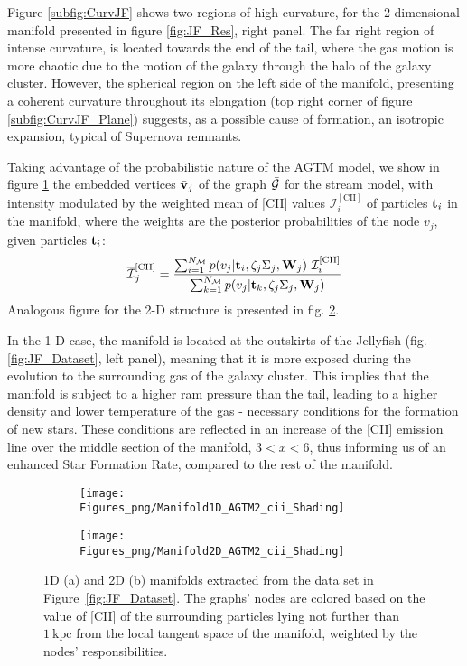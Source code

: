Figure \ref{subfig:CurvJF} shows two regions of high curvature, for the 2-dimensional manifold presented in figure \ref{fig:JF_Res}, right panel.
The far right region of intense curvature, is located towards the end of the tail, where the gas motion is more chaotic due to the motion of the galaxy through the halo of the galaxy cluster. However, the spherical region on the left side of the manifold, presenting a coherent curvature throughout its elongation (top right corner of figure \ref{subfig:CurvJF_Plane}) suggests, as a possible cause of formation, an isotropic expansion, typical of Supernova remnants. 

Taking advantage of the probabilistic nature of the AGTM model, we show in figure \ref{subfig:1dManGraph} the embedded vertices
$\bar{\boldsymbol{\mathbf{v}}}_j$ of the graph $\bar{\cal G}$
for the stream model, with intensity modulated by the weighted mean of [CII] values $\mathcal{I}^{\mathrm{[CII]}}_i$ of particles $\boldsymbol{\mathbf{t}}_i$ in the manifold, where the weights are the posterior probabilities of the node $v_j$, given  particles $\boldsymbol{\mathbf{t}}_i$:
\begin{equation}\label{eq:WeightedVar}
    \overline{\mathcal{I}}^{\mathrm{[CII]}}_j = \frac{\sum_{i=1}^{N_{\mathcal{M}}} p(v_j | \boldsymbol{\mathbf{t}}_i,\zeta_j\Sigma_j,\boldsymbol{\mathbf{W}}_j) ~ \mathcal{I}^{\mathrm{[CII]}}_i}{\sum_{k=1}^{N_{\mathcal{M}}} p(v_j | \boldsymbol{\mathbf{t}}_k,\zeta_j\Sigma_j,\boldsymbol{\mathbf{W}}_j)}
\end{equation}
Analogous figure for the 2-D structure is presented in fig. \ref{subfig:2dManGraph}.

In the 1-D case, the manifold is located at the outskirts of the Jellyfish (fig. \ref{fig:JF_Dataset}, left panel), meaning that it is more exposed during the evolution to the surrounding gas of the galaxy cluster. This implies that the manifold is subject to a higher ram pressure than the tail, leading to a higher density and lower temperature of the gas - necessary conditions for the formation of new stars. These conditions are reflected in an increase of the [CII] emission line over the middle section of the manifold, $3 < x < 6$, thus informing us of an enhanced Star Formation Rate, compared to the rest of the manifold.
\begin{figure}[ht]
\centering
\begin{subfigure}[t]{0.48\textwidth}
 \caption{}
 \label{subfig:1dManGraph}
 \texttt{[image: Figures\_png/Manifold1D\_AGTM2\_cii\_Shading]}
\end{subfigure}
\begin{subfigure}[t]{0.49\textwidth}
 \caption{}
 \label{subfig:2dManGraph}
 \texttt{[image: Figures\_png/Manifold2D\_AGTM2\_cii\_Shading]}
\end{subfigure}
\caption{1D (a) and 2D (b) manifolds extracted from the data set in Figure~\ref{fig:JF_Dataset}.
The graphs' nodes are colored based on the value of [CII] of the surrounding particles lying not further than $\mathrm{1~kpc}$ from the local tangent space of the manifold, weighted by the nodes' responsibilities.}
\label{fig:Man2D}
\end{figure}

